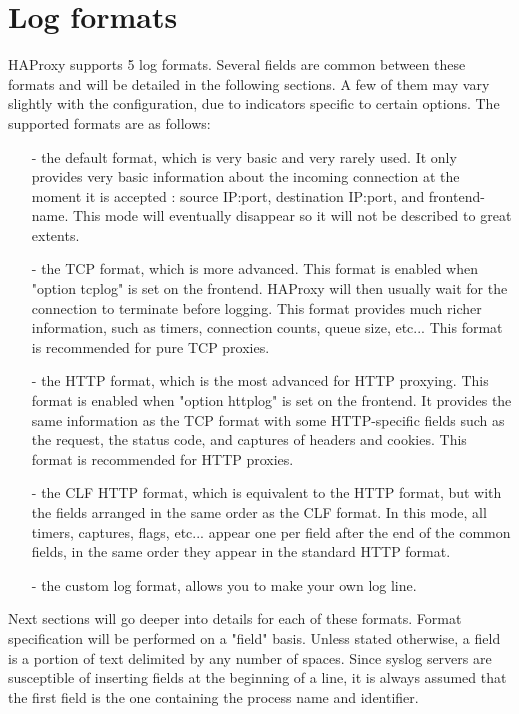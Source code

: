 \section{Log formats}

HAProxy supports 5 log formats. Several fields are common between these formats
and will be detailed in the following sections. A few of them may vary
slightly with the configuration, due to indicators specific to certain
options. The supported formats are as follows:

\begin{itemize}
\item[-] the default format, which is very basic and very rarely used. It only
    provides very basic information about the incoming connection at the moment
    it is accepted : source IP:port, destination IP:port, and frontend-name.
    This mode will eventually disappear so it will not be described to great
    extents.

\item[-] the TCP format, which is more advanced. This format is enabled when "option
    tcplog" is set on the frontend. HAProxy will then usually wait for the
    connection to terminate before logging. This format provides much richer
    information, such as timers, connection counts, queue size, etc... This
    format is recommended for pure TCP proxies.

\item[-] the HTTP format, which is the most advanced for HTTP proxying. This format
    is enabled when "option httplog" is set on the frontend. It provides the
    same information as the TCP format with some HTTP-specific fields such as
    the request, the status code, and captures of headers and cookies. This
    format is recommended for HTTP proxies.

\item[-] the CLF HTTP format, which is equivalent to the HTTP format, but with the
    fields arranged in the same order as the CLF format. In this mode, all
    timers, captures, flags, etc... appear one per field after the end of the
    common fields, in the same order they appear in the standard HTTP format.

\item[-] the custom log format, allows you to make your own log line.
\end{itemize}

Next sections will go deeper into details for each of these formats. Format
specification will be performed on a "field" basis. Unless stated otherwise, a
field is a portion of text delimited by any number of spaces. Since syslog
servers are susceptible of inserting fields at the beginning of a line, it is
always assumed that the first field is the one containing the process name and
identifier.

